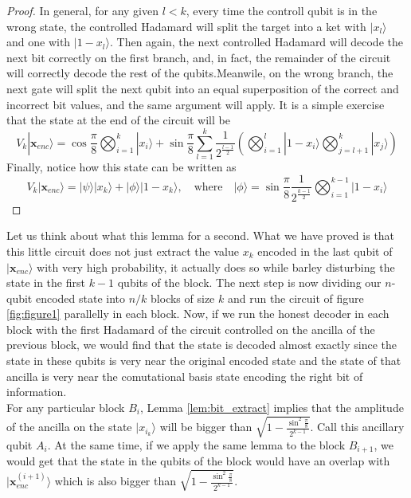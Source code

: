 \documentclass{article}
\theoremstyle{definition}
\newcommand{\ket}[1]{|#1\rangle}
\begin{document}
\begin{proof}
In general, for any given $l<k$, every time the controll qubit is in the wrong state, the controlled Hadamard will split the target into a ket with $\ket{x_l}$ and one with $\ket{1-x_l}$. Then again, the next controlled Hadamard will decode the next bit correctly on the first branch, and, in fact, the remainder of the circuit will correctly decode the rest of the qubits.Meanwile, on the wrong branch, the next gate will split the next qubit into an equal superposition of the correct and incorrect bit values, and the same argument will apply. It is a simple exercise that the state at the end of the circuit will be
\begin{equation}
V_k\ket{\textbf{x}_{enc}}=\cos\frac{\pi}{8}\bigotimes_{i=1}^k\ket{x_i}+\sin\frac{\pi}{8}\sum_{l=1}^k\frac{1}{2^{\frac{l-1}{2}}}\left(\bigotimes_{i=1}^l\ket{1-x_i}\bigotimes_{j=l+1}^k\ket{x_j}\right)
\end{equation}
Finally, notice how this state can be written as
\[V_k\ket{\textbf{x}_{enc}}=\ket{\psi}\ket{x_k}+\ket{\phi}\ket{1-x_k},\quad \text{where} \quad \ket{\phi}=\sin\frac{\pi}{8}\frac{1}{2^{\frac{k-1}{2}}}\bigotimes_{i=1}^{k-1}\ket{1-x_i}\]

\end{proof}

Let us think about what this lemma for a second. What we have proved is that this little circuit does not just extract the value $x_k$ encoded in the last qubit of $\ket{\textbf{x}_{enc}}$ with very high probability, it actually does so while barley disturbing the state in the first $k-1$ qubits of the block. The next step is now dividing our $n$-qubit encoded state into $n/k$ blocks of size $k$ and run the circuit of figure \ref{fig:figure1} parallelly in each block. Now, if we run the honest decoder in each block with the first Hadamard of the circuit controlled on the ancilla of the previous block, we would find that the state is decoded almost exactly since the state in these qubits is very near the original encoded state and the state of that ancilla is very near the comutational basis state encoding the right bit of information.\\

For any particular block $B_i$, Lemma \ref{lem:bit_extract} implies that the amplitude of the ancilla on the state $\ket{x_{i_k}}$ will be  bigger than $ \sqrt{1-\frac{\sin^2\frac{\pi}{8}}{2^{k-1}}}$. Call this ancillary qubit $A_i$. At the same time, if we apply the same lemma to the block $B_{i+1}$, we would get that the state in the qubits of the block would have an overlap with $\ket{\textbf{x}^{(i+1)}_{enc}}$ which is also bigger than $ \sqrt{1-\frac{\sin^2\frac{\pi}{8}}{2^{k-1}}}$.\\
\end{document}
